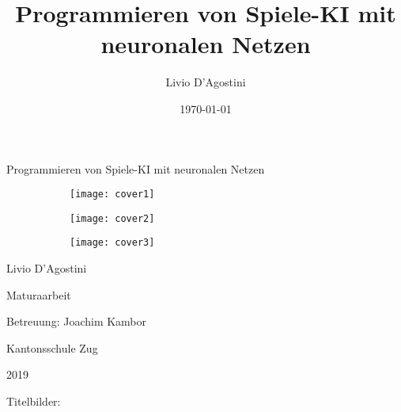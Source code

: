 \documentclass[12pt,a4paper]{article}
\author{Livio D'Agostini}
\title{Programmieren von Spiele-KI mit neuronalen Netzen}
\date{\today}
\begin{document}
\begin{titlepage}
\centering
\vspace{3cm}
\huge{Programmieren von Spiele-KI mit neuronalen Netzen\par}
\vspace{5cm}
\begin{figure}[!htb]
\begin{subfigure}{0.3\textwidth}
\texttt{[image: cover1]}
\end{subfigure}\hfill
\begin{subfigure}{0.3\textwidth}
\texttt{[image: cover2]}
\end{subfigure}\hfill
\begin{subfigure}{0.3\textwidth}
\texttt{[image: cover3]}
\end{subfigure}
\end{figure}




\vfill
\large{
Livio D'Agostini\par
Maturaarbeit\par
Betreuung: Joachim Kambor\par
Kantonsschule Zug\par
2019\par
\tiny{Titelbilder: \cite{cover1}\cite{cover3}}}

\end{titlepage}

\tableofcontents
\newpage
\end{document}
